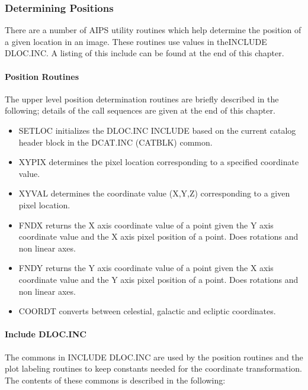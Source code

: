 \subsubsection{Determining Positions }
There are a number of AIPS utility routines which help determine the
position of a given location in an image.  These routines use values
in theINCLUDE DLOC.INC.  A listing of this include can be found at the
end of this chapter.

\paragraph{Position Routines}
The upper level position determination routines are briefly described
in the following; details of the call sequences are given at the end
of this chapter.
\begin{itemize} %
\item SETLOC initializes the DLOC.INC INCLUDE based on the current catalog
header block in the DCAT.INC (CATBLK) common.
\item XYPIX determines the pixel location corresponding to a specified
coordinate value.
\item XYVAL determines the coordinate value (X,Y,Z) corresponding to a
given pixel location.
\item FNDX returns the X axis coordinate value of a point given the Y axis
coordinate value and the X axis pixel position of a point.  Does
rotations and non linear axes.
\item FNDY returns the Y axis coordinate value of a point given the X axis
coordinate value and the Y axis pixel position of a point.  Does
rotations and non linear axes.
\item COORDT converts between celestial, galactic and ecliptic coordinates.


\end{itemize} %
\paragraph{Include DLOC.INC}
The commons in INCLUDE DLOC.INC are used by the position routines and
the plot labeling routines to keep constants needed for the coordinate
transformation.  The contents of these commons is described in the
following:

